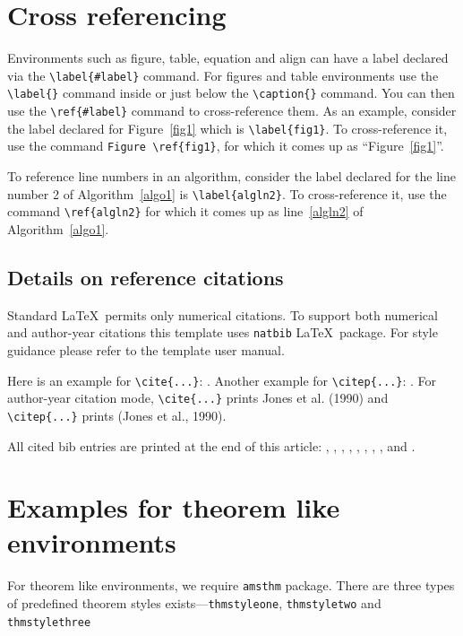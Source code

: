 \documentclass[sn-mathphys]{sn-jnl}%
\theoremstyle{thmstyleone}%
\theoremstyle{thmstyletwo}%
\theoremstyle{thmstylethree}%
\begin{document}
\section{Cross referencing}\label{sec8}

Environments such as figure, table, equation and align can have a label
declared via the \verb+\label{#label}+ command. For figures and table
environments use the \verb+\label{}+ command inside or just
below the \verb+\caption{}+ command. You can then use the
\verb+\ref{#label}+ command to cross-reference them. As an example, consider
the label declared for Figure~\ref{fig1} which is
\verb+\label{fig1}+. To cross-reference it, use the command 
\verb+Figure \ref{fig1}+, for which it comes up as
``Figure~\ref{fig1}''. 

To reference line numbers in an algorithm, consider the label declared for the line number 2 of Algorithm~\ref{algo1} is \verb+\label{algln2}+. To cross-reference it, use the command \verb+\ref{algln2}+ for which it comes up as line~\ref{algln2} of Algorithm~\ref{algo1}.

\subsection{Details on reference citations}\label{subsec7}

Standard \LaTeX\ permits only numerical citations. To support both numerical and author-year citations this template uses \verb+natbib+ \LaTeX\ package. For style guidance please refer to the template user manual.

Here is an example for \verb+\cite{...}+: \cite{bib1}. Another example for \verb+\citep{...}+: \citep{bib2}. For author-year citation mode, \verb+\cite{...}+ prints Jones et al. (1990) and \verb+\citep{...}+ prints (Jones et al., 1990).

All cited bib entries are printed at the end of this article: \cite{bib3}, \cite{bib4}, \cite{bib5}, \cite{bib6}, \cite{bib7}, \cite{bib8}, \cite{bib9}, \cite{bib10}, \cite{bib11} and \cite{bib12}.

\section{Examples for theorem like environments}\label{sec10}

For theorem like environments, we require \verb+amsthm+ package. There are three types of predefined theorem styles exists---\verb+thmstyleone+, \verb+thmstyletwo+ and \verb+thmstylethree+ 
\end{document}
